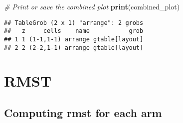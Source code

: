 \documentclass[
]{article}
\newenvironment{Shaded}{\begin{snugshade}}{\end{snugshade}}
\newcommand{\CommentTok}[1]{\textcolor[rgb]{0.56,0.35,0.01}{\textit{#1}}}
\newcommand{\FunctionTok}[1]{\textcolor[rgb]{0.13,0.29,0.53}{\textbf{#1}}}
\newcommand{\NormalTok}[1]{#1}
\begin{document}
\begin{Shaded}
\begin{Highlighting}[]
\CommentTok{\# Print or save the combined plot}
\FunctionTok{print}\NormalTok{(combined\_plot)}
\end{Highlighting}
\end{Shaded}

\begin{verbatim}
## TableGrob (2 x 1) "arrange": 2 grobs
##   z     cells    name           grob
## 1 1 (1-1,1-1) arrange gtable[layout]
## 2 2 (2-2,1-1) arrange gtable[layout]
\end{verbatim}

\hypertarget{rmst}{%
\section{RMST}\label{rmst}}

\hypertarget{computing-rmst-for-each-arm}{%
\subsection{Computing rmst for each
arm}\label{computing-rmst-for-each-arm}}
\end{document}

